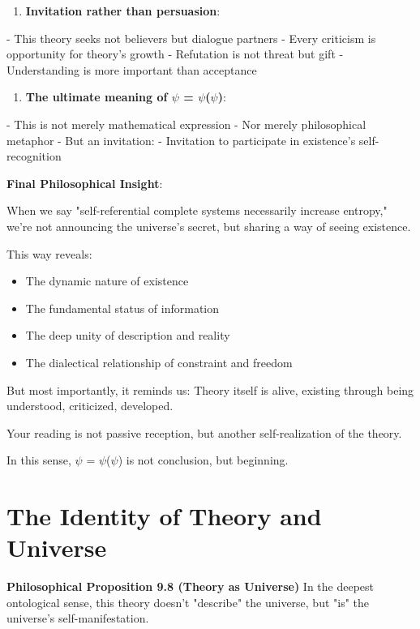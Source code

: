\begin{enumerate}
\item \textbf{Invitation rather than persuasion}:
\end{enumerate}
   - This theory seeks not believers but dialogue partners
   - Every criticism is opportunity for theory's growth
   - Refutation is not threat but gift
   - Understanding is more important than acceptance

\begin{enumerate}
\item \textbf{The ultimate meaning of $\psi$ = $\psi$($\psi$)}:
\end{enumerate}
   - This is not merely mathematical expression
   - Nor merely philosophical metaphor
   - But an invitation:
   - Invitation to participate in existence's self-recognition

\textbf{Final Philosophical Insight}:

When we say "self-referential complete systems necessarily increase entropy,"
we're not announcing the universe's secret,
but sharing a way of seeing existence.

This way reveals:
\begin{itemize}
\item The dynamic nature of existence
\item The fundamental status of information
\item The deep unity of description and reality
\item The dialectical relationship of constraint and freedom
\end{itemize}

But most importantly, it reminds us:
Theory itself is alive,
existing through being understood, criticized, developed.

Your reading is not passive reception,
but another self-realization of the theory.

In this sense,
$\psi$ = $\psi$($\psi$)
is not conclusion,
but beginning.

\section{The Identity of Theory and Universe}
\label{sec:ch09_philosophy:the-identity-of-theory-and-universe}

\textbf{Philosophical Proposition 9.8 (Theory as Universe)}
In the deepest ontological sense, this theory doesn't "describe" the universe, but "is" the universe's self-manifestation.

